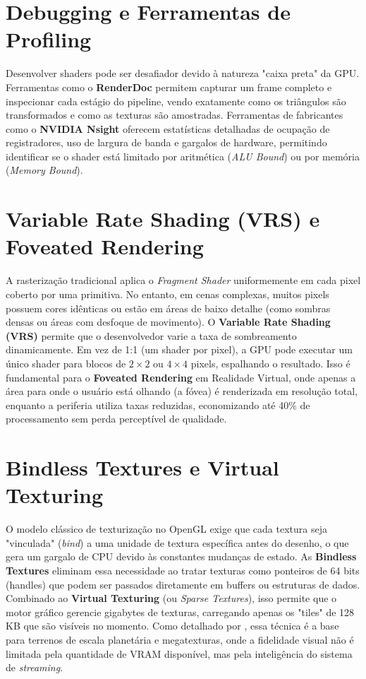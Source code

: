 \section{Debugging e Ferramentas de Profiling}

Desenvolver shaders pode ser desafiador devido à natureza "caixa preta" da GPU. Ferramentas como o \textbf{RenderDoc} permitem capturar um frame completo e inspecionar cada estágio do pipeline, vendo exatamente como os triângulos são transformados e como as texturas são amostradas. Ferramentas de fabricantes como o \textbf{NVIDIA Nsight} oferecem estatísticas detalhadas de ocupação de registradores, uso de largura de banda e gargalos de hardware, permitindo identificar se o shader está limitado por aritmética (\textit{ALU Bound}) ou por memória (\textit{Memory Bound}).

\section{Variable Rate Shading (VRS) e Foveated Rendering}

A rasterização tradicional aplica o \textit{Fragment Shader} uniformemente em cada pixel coberto por uma primitiva. No entanto, em cenas complexas, muitos pixels possuem cores idênticas ou estão em áreas de baixo detalhe (como sombras densas ou áreas com desfoque de movimento). O \textbf{Variable Rate Shading (VRS)} permite que o desenvolvedor varie a taxa de sombreamento dinamicamente. Em vez de 1:1 (um shader por pixel), a GPU pode executar um único shader para blocos de $2 \times 2$ ou $4 \times 4$ pixels, espalhando o resultado. Isso é fundamental para o \textbf{Foveated Rendering} em Realidade Virtual, onde apenas a área para onde o usuário está olhando (a fóvea) é renderizada em resolução total, enquanto a periferia utiliza taxas reduzidas, economizando até 40\% de processamento sem perda perceptível de qualidade.

\section{Bindless Textures e Virtual Texturing}

O modelo clássico de texturização no OpenGL exige que cada textura seja "vinculada" (\textit{bind}) a uma unidade de textura específica antes do desenho, o que gera um gargalo de CPU devido às constantes mudanças de estado. As \textbf{Bindless Textures} eliminam essa necessidade ao tratar texturas como ponteiros de 64 bits (handles) que podem ser passados diretamente em buffers ou estruturas de dados. Combinado ao \textbf{Virtual Texturing} (ou \textit{Sparse Textures}), isso permite que o motor gráfico gerencie gigabytes de texturas, carregando apenas os "tiles" de 128 KB que são visíveis no momento. Como detalhado por \textcite{akenine2018realtime}, essa técnica é a base para terrenos de escala planetária e megatexturas, onde a fidelidade visual não é limitada pela quantidade de VRAM disponível, mas pela inteligência do sistema de \textit{streaming}.

